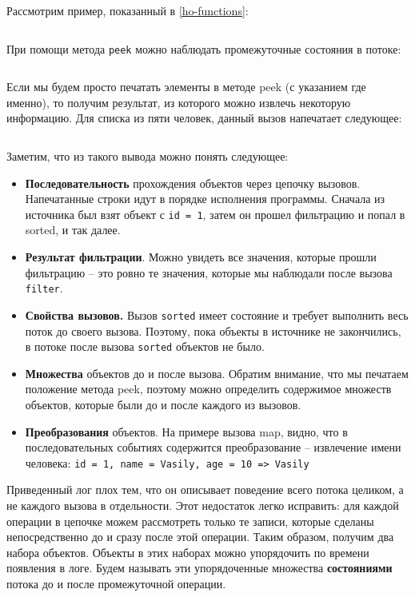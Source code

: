 Рассмотрим пример, показанный в \ref{ho-functions}:

\inputminted{java}{chapter2/code/StreaMWithoutPeeks.java}
При помощи метода \texttt{peek} можно наблюдать промежуточные состояния в потоке:
\inputminted{java}{chapter2/code/StreamWithPeeks.java}

Если мы будем просто печатать элементы в методе peek (с указанием где именно), то получим результат, из которого можно извлечь некоторую информацию. Для списка из пяти человек, данный вызов напечатает следующее:
\inputminted{java}{chapter2/code/peekResults.txt}

Заметим, что из такого вывода можно понять следующее:
\begin{itemize}
	\item \textbf{Последовательность} прохождения объектов через цепочку вызовов. Напечатанные строки идут в порядке исполнения программы. Сначала из источника был взят объект с \texttt{id = 1}, затем он прошел фильтрацию и попал в sorted, и так далее.
	\item \textbf{Результат фильтрации}. Можно увидеть все значения, которые прошли фильтрацию -- это ровно те значения, которые мы наблюдали после вызова \texttt{filter}.
	\item \textbf{Свойства вызовов.} Вызов \texttt{sorted} имеет состояние и требует выполнить весь поток до своего вызова. Поэтому, пока объекты в источнике не закончились, в потоке после вызова \texttt{sorted} объектов не было.
	\item \textbf{Множества } объектов до и после вызова. Обратим внимание, что мы печатаем положение метода peek, поэтому можно определить содержимое множеств объектов, которые были до и после каждого из вызовов.
	\item \textbf{Преобразования} объектов. На примере вызова map, видно, что в последовательных событиях содержится преобразование -- извлечение имени человека: \texttt{{id = 1, name = Vasily, age = 10} => Vasily}
\end{itemize}

Приведенный лог плох тем, что он описывает поведение всего потока целиком, а не каждого вызова в отдельности. Этот недостаток легко исправить: для каждой операции в цепочке можем рассмотреть только те записи, которые сделаны непосредственно до и сразу после этой операции. Таким образом, получим два набора объектов. Объекты в этих наборах можно упорядочить по времени появления в логе. Будем называть эти упорядоченные множества \textbf{состояниями} потока до и после промежуточной операции. 

